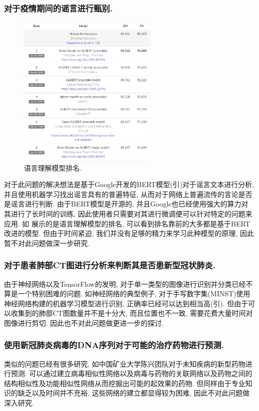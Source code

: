 \documentclass[lang=cn,11pt]{elegantpaper}
\begin{document}
\subsubsection*{对于疫情期间的谣言进行甄别.} 
\begin{figure}[htbp]
  \centering
  \includegraphics[width=0.6\textwidth]{rank}
  \caption{语言理解模型排名. \label{fig:rank}}
\end{figure}
对于此问题的解决想法是基于Google开发的BERT模型(引)对于谣言文本进行分析, 并且使用机器学习找出谣言具有的普遍特征, 从而对于网络上普遍流传的言论是否是谣言进行判断. 由于BERT模型是开源的, 并且Google也已经使用强大的算力对其进行了长时间的训练, 因此使用者只需要对其进行微调便可以针对特定的问题来应用. 如 展示的是语言理解模型的排名, 可以看到排名靠前的大多都是基于BERT改进的模型. 但由于时间紧迫, 我们并没有足够的精力来学习此种模型的原理, 因此暂不对此问题做深一步研究. 
\subsubsection*{对于患者肺部CT图进行分析来判断其是否患新型冠状肺炎.}
由于神经网络以及TensorFlow的发明, 对于单一类型的图像进行识别并分类已经不算是一个特别困难的问题. 如神经网络的典型例子, 对于手写数字集(MINST)使用神经网络构建的机器学习模型进行识别, 正确率已经可以达到相当高(引). 但由于可以收集到的肺部CT图数量并不是十分大, 而且位置也不一致, 需要花费大量时间对图像进行剪切. 因此也不对此问题做更进一步的探讨. 
\subsubsection*{使用新冠肺炎病毒的DNA序列对于可能的治疗药物进行预测. }
类似的问题已经有很多研究, 如中国矿业大学陈兴团队对于未知疾病的新型药物进行预测. 可以通过建立病毒相似性网络以及病毒与药物的关联网络以及药物之间的结构相似性及功能相似性网络从而挖掘出可能的起效果的药物. 但同样由于专业知识的缺乏以及时间并不充裕, 这些网络的建立都显得较为困难, 因此不对此问题做深入研究. 
\end{document}
